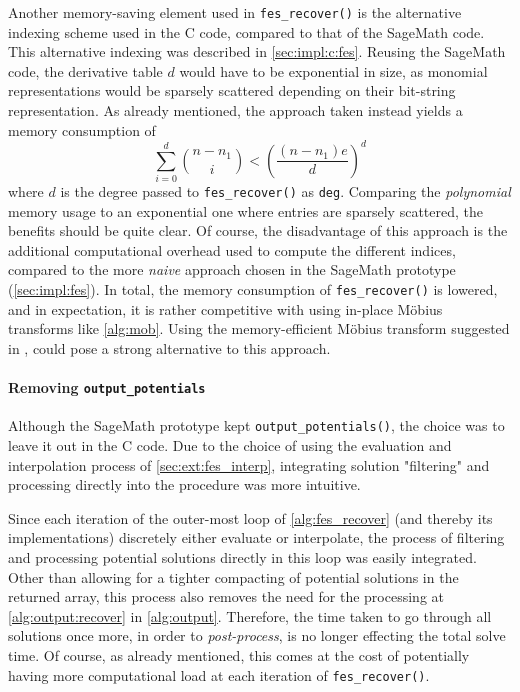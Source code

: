 Another memory-saving element used in \texttt{fes\_recover()} is the alternative indexing scheme used in the C code, compared to that of the SageMath code. This alternative indexing was described in \cref{sec:impl:c:fes}. Reusing the SageMath code, the derivative table $d$ would have to be exponential in size, as monomial representations would be sparsely scattered depending on their bit-string representation. As already mentioned, the approach taken instead yields a memory consumption of 
$$
    \sum_{i = 0 }^{d} \binom{n - n_1}{i} < \left(\frac{(n - n_1)e}{d}\right)^d
$$
where $d$ is the degree passed to \texttt{fes\_recover()} as \texttt{deg}. Comparing the \textit{polynomial} memory usage to an exponential one where entries are sparsely scattered, the benefits should be quite clear. Of course, the disadvantage of this approach is the additional computational overhead used to compute the different indices, compared to the more \textit{naive} approach chosen in the SageMath prototype (\cref{sec:impl:fes}).
In total, the memory consumption of \texttt{fes\_recover()} is lowered, and in expectation, it is rather competitive with using in-place Möbius transforms like \cref{alg:mob}. Using the memory-efficient Möbius transform suggested in \cite{eurocrypt-2021-30841}, could pose a strong alternative to this approach.

\paragraph*{Removing \texttt{output\_potentials}} Although the SageMath prototype kept \texttt{output\_potentials()}, the choice was to leave it out in the C code. Due to the choice of using the evaluation and interpolation process of \cref{sec:ext:fes_interp}, integrating solution "filtering" and processing directly into the procedure was more intuitive.

Since each iteration of the outer-most loop of \cref{alg:fes_recover} (and thereby its implementations) discretely either evaluate or interpolate, the process of filtering and processing potential solutions directly in this loop was easily integrated. Other than allowing for a tighter compacting of potential solutions in the returned array, this process also removes the need for the processing at \cref{alg:output:recover} in \cref{alg:output}. Therefore, the time taken to go through all solutions once more, in order to \textit{post-process}, is no longer effecting the total solve time. Of course, as already mentioned, this comes at the cost of potentially having more computational load at each iteration of \texttt{fes\_recover()}.

